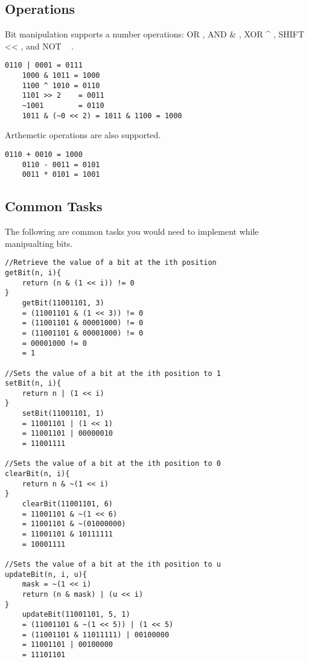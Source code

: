 \documentclass{article}
\begin{document}
	\subsection{Operations}
	Bit manipulation supports a number operations: OR \text{\textbar}, AND \& , XOR \string^ , SHIFT << , and NOT \string~ .
	\begin{lstlisting}[style=pseudo]
	0110 | 0001 = 0111
	1000 & 1011 = 1000
	1100 ^ 1010 = 0110
	1101 >> 2    = 0011
	~1001        = 0110
	1011 & (~0 << 2) = 1011 & 1100 = 1000
	\end{lstlisting}
	Arthemetic operations are also supported.
	\begin{lstlisting}[style=pseudo]
	0110 + 0010 = 1000
	0110 - 0011 = 0101
	0011 * 0101 = 1001
	\end{lstlisting}

	\subsection{Common Tasks}
	The following are common tasks you would need to implement while manipualting bits.
	\begin{lstlisting}[style=pseudo]
//Retrieve the value of a bit at the ith position
getBit(n, i){
	return (n & (1 << i)) != 0
}
	getBit(11001101, 3)
	= (11001101 & (1 << 3)) != 0
	= (11001101 & 00001000) != 0
	= (11001101 & 00001000) != 0
	= 00001000 != 0
	= 1

//Sets the value of a bit at the ith position to 1
setBit(n, i){
	return n | (1 << i)
}
	setBit(11001101, 1)
	= 11001101 | (1 << 1)
	= 11001101 | 00000010
	= 11001111

//Sets the value of a bit at the ith position to 0
clearBit(n, i){
	return n & ~(1 << i)
}
	clearBit(11001101, 6)
	= 11001101 & ~(1 << 6)
	= 11001101 & ~(01000000)
	= 11001101 & 10111111
	= 10001111

//Sets the value of a bit at the ith position to u
updateBit(n, i, u){
	mask = ~(1 << i)
	return (n & mask) | (u << i)
}
	updateBit(11001101, 5, 1)
	= (11001101 & ~(1 << 5)) | (1 << 5)
	= (11001101 & 11011111) | 00100000
	= 11001101 | 00100000
	= 11101101
	\end{lstlisting}
\end{document}
